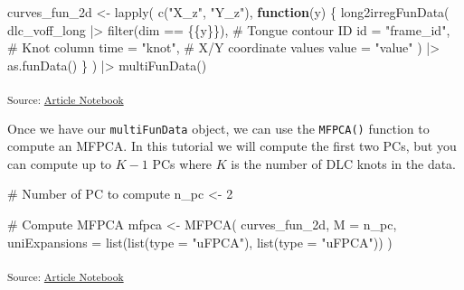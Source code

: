 \documentclass[
]{interact}
\newenvironment{Shaded}{\begin{snugshade}}{\end{snugshade}}
\newcommand{\AttributeTok}[1]{\textcolor[rgb]{0.40,0.45,0.13}{#1}}
\newcommand{\CommentTok}[1]{\textcolor[rgb]{0.37,0.37,0.37}{#1}}
\newcommand{\ControlFlowTok}[1]{\textcolor[rgb]{0.00,0.23,0.31}{\textbf{#1}}}
\newcommand{\DecValTok}[1]{\textcolor[rgb]{0.68,0.00,0.00}{#1}}
\newcommand{\FunctionTok}[1]{\textcolor[rgb]{0.28,0.35,0.67}{#1}}
\newcommand{\NormalTok}[1]{\textcolor[rgb]{0.00,0.23,0.31}{#1}}
\newcommand{\OtherTok}[1]{\textcolor[rgb]{0.00,0.23,0.31}{#1}}
\newcommand{\SpecialCharTok}[1]{\textcolor[rgb]{0.37,0.37,0.37}{#1}}
\newcommand{\StringTok}[1]{\textcolor[rgb]{0.13,0.47,0.30}{#1}}
\begin{document}
\begin{Shaded}
\begin{Highlighting}[]
\NormalTok{curves\_fun\_2d }\OtherTok{\textless{}{-}} \FunctionTok{lapply}\NormalTok{(}
  \FunctionTok{c}\NormalTok{(}\StringTok{"X\_z"}\NormalTok{, }\StringTok{"Y\_z"}\NormalTok{),}
  \ControlFlowTok{function}\NormalTok{(y) \{}
    \FunctionTok{long2irregFunData}\NormalTok{(}
\NormalTok{      dlc\_voff\_long }\SpecialCharTok{|\textgreater{}} \FunctionTok{filter}\NormalTok{(dim }\SpecialCharTok{==}\NormalTok{ \{\{y\}\}),}
      \CommentTok{\# Tongue contour ID}
      \AttributeTok{id =} \StringTok{"frame\_id"}\NormalTok{,}
      \CommentTok{\# Knot column}
      \AttributeTok{time =} \StringTok{"knot"}\NormalTok{,}
      \CommentTok{\# X/Y coordinate values}
      \AttributeTok{value =} \StringTok{"value"}
\NormalTok{    ) }\SpecialCharTok{|\textgreater{}} 
    \FunctionTok{as.funData}\NormalTok{()}
\NormalTok{  \}}
\NormalTok{) }\SpecialCharTok{|\textgreater{}} 
  \FunctionTok{multiFunData}\NormalTok{()}
\end{Highlighting}
\end{Shaded}

\textsubscript{Source:
\href{https://stefanocoretta.github.io/mv_uti/index.qmd.html}{Article
Notebook}}

Once we have our \texttt{multiFunData} object, we can use the
\texttt{MFPCA()} function to compute an MFPCA. In this tutorial we will
compute the first two PCs, but you can compute up to \(K-1\) PCs where
\(K\) is the number of DLC knots in the data.

\begin{Shaded}
\begin{Highlighting}[]
\CommentTok{\# Number of PC to compute}
\NormalTok{n\_pc }\OtherTok{\textless{}{-}} \DecValTok{2}

\CommentTok{\# Compute MFPCA}
\NormalTok{mfpca }\OtherTok{\textless{}{-}} \FunctionTok{MFPCA}\NormalTok{(}
\NormalTok{  curves\_fun\_2d,}
  \AttributeTok{M =}\NormalTok{ n\_pc,}
  \AttributeTok{uniExpansions =} \FunctionTok{list}\NormalTok{(}\FunctionTok{list}\NormalTok{(}\AttributeTok{type =} \StringTok{"uFPCA"}\NormalTok{), }\FunctionTok{list}\NormalTok{(}\AttributeTok{type =} \StringTok{"uFPCA"}\NormalTok{))}
\NormalTok{)}
\end{Highlighting}
\end{Shaded}

\textsubscript{Source:
\href{https://stefanocoretta.github.io/mv_uti/index.qmd.html}{Article
Notebook}}
\end{document}
